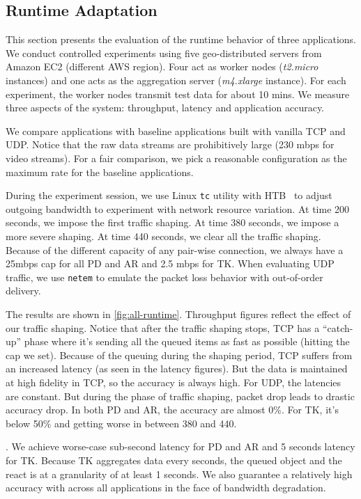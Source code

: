 \newpage

\subsection{Runtime Adaptation}
\label{sec:runtime-adaptation}

This section presents the evaluation of the runtime behavior of three
applications. We conduct controlled experiments using five geo-distributed
servers from Amazon EC2 (different AWS region). Four act as worker nodes
(\textit{t2.micro} instances) and one acts as the aggregation server
(\textit{m4.xlarge} instance). For each experiment, the worker nodes transmit
test data for about 10 mins. We measure three aspects of the system: throughput,
latency and application accuracy.

We compare \sysname{} applications with baseline applications built with vanilla
TCP and UDP. Notice that the raw data streams are prohibitively large (230 mbps
for video streams). For a fair comparison, we pick a reasonable configuration as
the maximum rate for the baseline applications.

During the experiment session, we use Linux \texttt{tc} utility with
HTB~\cite{lartc} to adjust outgoing bandwidth to experiment with network
resource variation. At time 200 seconds, we impose the first traffic shaping. At
time 380 seconds, we impose a more severe shaping. At time 440 seconds, we clear
all the traffic shaping. Because of the different capacity of any pair-wise
connection, we always have a 25mbps cap for all PD and AR and 2.5 mbps for
TK. When evaluating UDP traffic, we use \texttt{netem} to emulate the packet
loss behavior with out-of-order delivery.

The results are shown in \autoref{fig:all-runtime}. Throughput figures reflect
the effect of our traffic shaping. Notice that after the traffic shaping stops,
TCP has a ``catch-up'' phase where it's sending all the queued items as fast as
possible (hitting the cap we set). Because of the queuing during the shaping
period, TCP suffers from an increased latency (as seen in the latency
figures). But the data is maintained at high fidelity in TCP, so the accuracy is
always high. For UDP, the latencies are constant. But during the phase of
traffic shaping, packet drop leads to drastic accuracy drop. In both PD and AR,
the accuracy are almost 0\%. For TK, it's below 50\% and getting worse in
between 380 and 440.

. We
achieve worse-case sub-second latency for PD and AR and 5 seconds latency for
TK. Because TK aggregates data every seconds, the queued object and the react is
at a granularity of at least 1 seconds. We also guarantee a relatively high
accuracy with across all applications in the face of bandwidth degradation.

